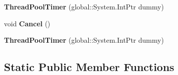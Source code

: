 \begin{DoxyCompactItemize}
{\bfseries Thread\+Pool\+Timer} (global\+::\+System.\+Int\+Ptr dummy)
\item 
\mbox{\label{class_windows_1_1_system_1_1_threading_1_1_thread_pool_timer_afbfa6a933071d9fef76cbef430885bb1}} 
void {\bfseries Cancel} ()
\item 
\mbox{\label{class_windows_1_1_system_1_1_threading_1_1_thread_pool_timer_a1de1370e64bbffd017113a0af6ec3a53}} 
{\bfseries Thread\+Pool\+Timer} (global\+::\+System.\+Int\+Ptr dummy)
\end{DoxyCompactItemize}
\subsection*{Static Public Member Functions}
